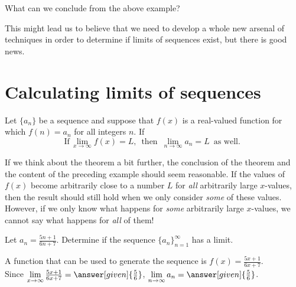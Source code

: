 \documentclass{ximera}
\begin{document}
What can we conclude from the above example?

\begin{multipleChoice}
\end{multipleChoice}

This might lead us to believe that we need to develop a whole new arsenal of techniques in order to determine if limits of sequences exist, but there is good news.










\section{Calculating limits of sequences}

\begin{theorem}
  Let $\{a_n\}$ be a sequence and suppose that $f(x)$ is a real-valued function for which $f(n) = a_n$ for all integers $n$.  If
  \[
  \text{If} \, \lim\limits_{x\to\infty}f(x)=L, \, \text{ then } \, \lim\limits_{n\to\infty} a_n=L \, \text{ as well. }
  \]
 
\end{theorem}

If we think about the theorem a bit further, the conclusion  of the theorem and the content of the preceding example should seem reasonable.  If the values of $f(x)$ become arbitrarily close to a number $L$ for \emph{all} arbitrarily large $x$-values, then the result should still hold when we only consider \emph{some} of these values.  However, if we only know what happens for \emph{some} arbitrarily large $x$-values, we cannot say what happens for \emph{all} of them!










\begin{example}
Let $a_n = \frac{5n+1}{6n+7}$.  Determine if the sequence $\{a_n\}_{n=1}^{\infty}$ has a limit.

\begin{explanation}
A function that can be used to generate the sequence is $f(x) = \frac{5x+1}{6x+7}$.  \\

Since $\lim\limits_{x \to \infty} \frac{5x+1}{6x+7} = \answer[given]{\frac{5}{6}}$, $\lim\limits_{n \to \infty} a_n = \answer[given]{\frac{5}{6}}$.
\end{explanation}

\end{example}
\end{document}
